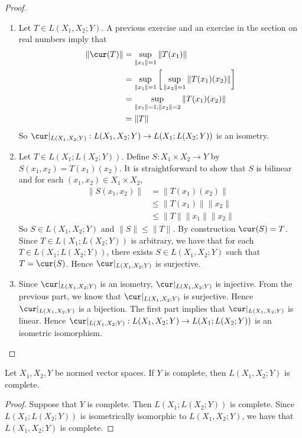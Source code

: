 \documentclass{book}
\begin{document}
\begin{proof}
\begin{enumerate}
		\item Let $T \in L(X_1, X_2; Y)$. A previous exercise and an exercise in the section on real numbers imply that 
		\begin{align*}
			\|\cur(T)\|
			& = \sup_{\|x_1\| = 1} \|T(x_1)\| \\
			& = \sup_{\|x_1\| = 1} \bigg[ \sup_{\|x_2\| = 1}\|T(x_1)(x_2)\| \bigg] \\
			& = \sup_{\|x_1\| = 1, \|x_2\| = 2} \|T(x_1)(x_2)\| \\
			& = \|T\|
		\end{align*}
		So $\cur|_{L(X_1, X_2;Y)}: L(X_1, X_2;Y) \rightarrow L(X_1; L(X_2;Y))$ is an isometry. 
		\item Let $T \in L(X_1; L(X_2; Y))$. Define $S: X_1 \times X_2 \rightarrow Y$ by $S(x_1, x_2) = T(x_1)(x_2)$. It is straightforward to show that $S$ is bilinear and for each $(x_1, x_2) \in X_1 \times X_2$, 
		\begin{align*}
			\|S(x_1, x_2)\|
			& = \|T(x_1)(x_2)\| \\
			& \leq \|T(x_1)\|\|x_2\| \\
			& \leq \|T\| \|x_1\| \|x_2\| 
		\end{align*} 
		So $S \in L(X_1, X_2; Y)$ and $\|S\| \leq \|T\|$. By construction $\cur(S) = T$. Since $T \in L(X_1; L(X_2; Y))$ is arbitrary, we have that for each $T \in L(X_1; L(X_2; Y))$, there exists $S \in L(X_1, X_2; Y)$ such that $T = \cur(S)$. Hence $\cur|_{L(X_1, X_2;Y)}$ is surjective.
		\item  Since $\cur|_{L(X_1, X_2;Y)}$ is an isometry, $\cur|_{L(X_1, X_2;Y)}$ is injective. From the previous part, we know that $\cur|_{L(X_1, X_2;Y)}$ is surjective. Hence $\cur|_{L(X_1, X_2;Y)}$ is a bijection. The first part implies that $\cur|_{L(X_1, X_2;Y)}$ is linear. Hence $\cur|_{L(X_1, X_2;Y)}: L(X_1, X_2;Y) \rightarrow L(X_1; L(X_2;Y))$ is an isometric isomorphism.
	\end{enumerate}
	\end{proof}	

	\begin{ex}
		Let $X_1, X_2, Y$ be normed vector spaces. If $Y$ is complete, then $L(X_1, X_2; Y)$ is complete.
	\end{ex}
	
	\begin{proof}
		Suppose that $Y$ is complete. Then $L(X_1; L(X_2; Y))$ is complete. Since $L(X_1; L(X_2; Y))$ is isometrically isomorphic to $L(X_1, X_2; Y)$, we have that $L(X_1, X_2; Y)$ is complete. 
	\end{proof}
	
\end{document}
